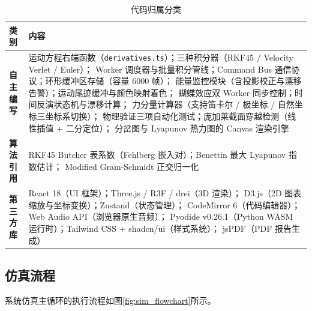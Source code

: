 \begin{table}[htbp]
  \centering
  \small
  \caption{代码归属分类}
  \label{tab:code_ownership}
  \begin{tabularx}{\textwidth}{l X}
    \toprule
    \textbf{类别} & \textbf{内容} \\
    \midrule
    \textbf{自主编写} &
    运动方程右端函数（\texttt{derivatives.ts}）；三种积分器（RKF45 / Velocity Verlet / Euler）；
    Worker 调度器与批量积分管线；Command Bus 通信协议；环形缓冲区存储（容量 6000 帧）；
    能量监控模块（含投影校正与漂移告警）；运动尾迹缓冲与颜色映射着色；
    蝴蝶效应双 Worker 同步控制；时间反演状态机与漂移计算；
    力分量计算器（支持笛卡尔 / 极坐标 / 自然坐标三坐标系切换）；
    物理验证三项自动化测试；庞加莱截面穿越检测（线性插值 + 二分定位）；
    分岔图与 Lyapunov 热力图的 Canvas 渲染引擎 \\
    \midrule
    \textbf{算法引用} &
    RKF45 Butcher 表系数（Fehlberg 嵌入对）；Benettin 最大 Lyapunov 指数估计；
    Modified Gram-Schmidt 正交归一化 \\
    \midrule
    \textbf{第三方库} &
    React 18（UI 框架）；Three.js / R3F / drei（3D 渲染）；
    D3.js（2D 图表缩放与坐标变换）；Zustand（状态管理）；
    CodeMirror 6（代码编辑器）；Web Audio API（浏览器原生音频）；
    Pyodide v0.26.1（Python WASM 运行时）；Tailwind CSS + shadcn/ui（样式系统）；
    jsPDF（PDF 报告生成） \\
    \bottomrule
  \end{tabularx}
\end{table}

\subsection{仿真流程}

系统仿真主循环的执行流程如图\ref{fig:sim_flowchart}所示。

